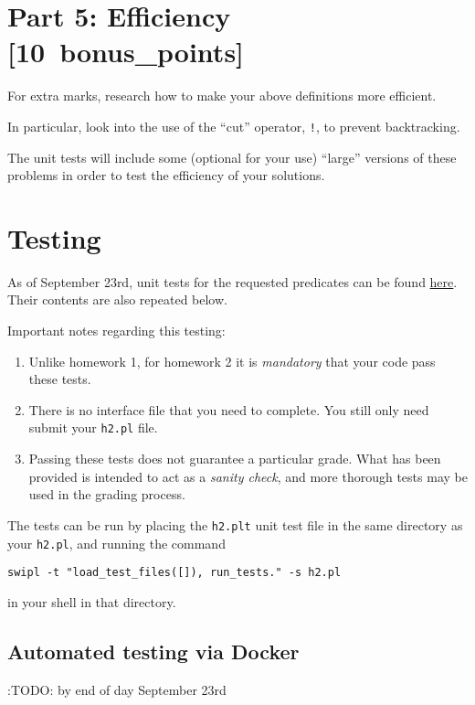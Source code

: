\documentclass[11pt]{article}
\begin{document}
\section*{Part 5: Efficiency                                     [10 bonus\_points]}
\label{sec:orga934e52}
For extra marks, research how to make your above definitions more efficient.

In particular, look into the use of the “cut” operator, \texttt{!},
to prevent backtracking.

The unit tests will include some (optional for your use) “large”
versions of these problems in order to test the efficiency
of your solutions.

\section*{Testing}
\label{sec:org47291a2}
As of September 23rd, unit tests for the requested predicates
can be found \href{./testing/h2/src/h2.plt}{here}. Their contents are also repeated below.

Important notes regarding this testing:
\begin{enumerate}
\item Unlike homework 1, for homework 2 it is \emph{mandatory}
that your code pass these tests.
\item There is no interface file that you need to complete.
You still only need submit your \texttt{h2.pl} file.
\item Passing these tests does not guarantee a particular grade.
What has been provided is intended to act as a \emph{sanity check},
and more thorough tests may be used in the grading process.
\end{enumerate}

The tests can be run by placing the \texttt{h2.plt} unit test file
in the same directory as your \texttt{h2.pl}, and running the command
\begin{verbatim}
swipl -t "load_test_files([]), run_tests." -s h2.pl
\end{verbatim}
in your shell in that directory.

\subsection*{Automated testing via Docker}
\label{sec:orgd6b151c}
:TODO: by end of day September 23rd
\end{document}
